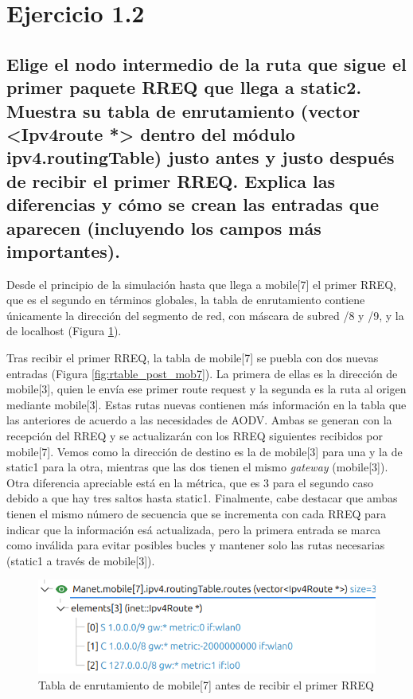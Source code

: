 \vspace{1.25cm}
\section{Ejercicio 1.2}

\subsection{Elige el nodo intermedio de la ruta que sigue el primer paquete RREQ que llega a static2. Muestra su tabla
de enrutamiento (vector <Ipv4route *> dentro del módulo ipv4.routingTable) justo antes y justo después de
recibir el primer RREQ. Explica las diferencias y cómo se crean las entradas que aparecen (incluyendo los campos
más importantes).}

Desde el principio de la simulación hasta que llega a mobile[7] el primer RREQ, que es el segundo en términos globales, la tabla de enrutamiento contiene únicamente la dirección del segmento de red, con máscara de subred /8 y /9, y la de localhost (Figura \ref{fig:rtable_prev_mob7}).

Tras recibir el primer RREQ, la tabla de mobile[7] se puebla con dos nuevas entradas (Figura \ref{fig:rtable_post_mob7}). La primera de ellas es la dirección de mobile[3], quien le envía ese primer route request y la segunda es la ruta al origen mediante mobile[3]. Estas rutas nuevas contienen más información en la tabla que las anteriores de acuerdo a las necesidades de AODV. Ambas se generan con la recepción del RREQ y se actualizarán con los RREQ siguientes recibidos por mobile[7]. Vemos como la dirección de destino es la de mobile[3] para una y la de static1 para la otra, mientras que las dos tienen el mismo \textit{gateway} (mobile[3]). Otra diferencia apreciable está en la métrica, que es 3 para el segundo caso debido a que hay tres saltos hasta static1. Finalmente, cabe destacar que ambas tienen el mismo número de secuencia que se incrementa con cada RREQ para indicar que la información esá actualizada, pero la primera entrada se marca como inválida para evitar posibles bucles y mantener solo las rutas necesarias (static1 a través de mobile[3]).

\begin{figure}[H]
    \centering
    \includegraphics[width=125mm, scale=0.75]{imaxes/aodv/ejercicio2_1.png}
    \caption{Tabla de enrutamiento de mobile[7] antes de recibir el primer RREQ}
    \label{fig:rtable_prev_mob7}
\end{figure}

